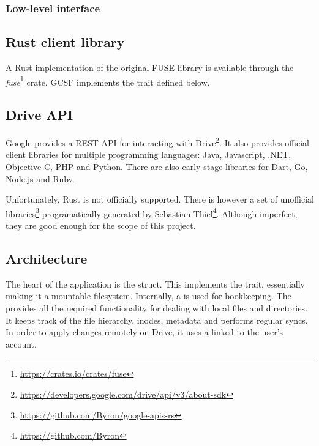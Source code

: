 \subsubsection{Low-level interface}


\subsection{Rust client library}

A Rust implementation of the original FUSE library is available through the \emph{fuse}\footnote{\url{https://crates.io/crates/fuse}} crate. GCSF implements the  trait defined below.



\subsection{Drive API}

Google provides a REST API for interacting with Drive\footnote{\url{https://developers.google.com/drive/api/v3/about-sdk}}. It also provides official client libraries for multiple programming languages: Java, Javascript, .NET, Objective-C, PHP and Python. There are also early-stage libraries for Dart, Go, Node.js and Ruby.

Unfortunately, Rust is not officially supported. There is however a set of unofficial libraries\footnote{\url{https://github.com/Byron/google-apis-rs}}  programatically generated by Sebastian Thiel\footnote{\url{https://github.com/Byron}}. Although imperfect, they are good enough for the scope of this project.

\subsection{Architecture}

The heart of the application is the  struct. This implements the  trait, essentially making it a mountable filesystem. Internally, a  is used for bookkeeping. The  provides all the required functionality for dealing with local files and directories. It keeps track of the file hierarchy, inodes, metadata and performs regular syncs. In order to apply changes remotely on Drive, it uses a  linked to the user's account.

